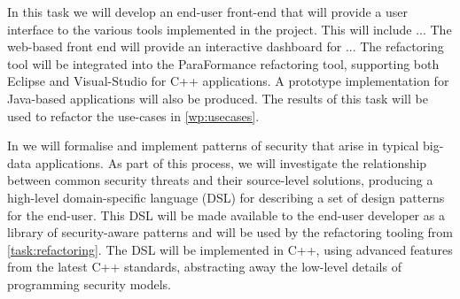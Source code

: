 \begin{Workpackage}{\thewpno}
\begin{Task}
\TaskResults{%
}
\TaskHeader{}

In this task we will develop an end-user front-end that will provide a user interface to the various tools implemented in the project. This will include ... 
The web-based front end will provide an interactive dashboard for ...
The refactoring tool will be integrated into the ParaFormance refactoring tool, supporting both Eclipse and Visual-Studio for C++ applications. A prototype implementation for Java-based applications will also be produced. The results of this task will be used to refactor the use-cases in \ref{wp:usecases}.



%
%
\end{Task}

\begin{Task}
	
	\TaskResults{%
	}
	\TaskHeader{}
	
In \theTask{} we will formalise and implement patterns of security that arise in typical big-data applications. As part of this process, we will investigate the relationship between common security threats and their source-level solutions, producing a high-level domain-specific language (DSL) for describing a set of design patterns for the end-user. This DSL will be made available to the end-user developer as a library of security-aware patterns and will be used by the refactoring tooling from \ref{task:refactoring}. The DSL will be implemented in C++, using advanced features from the latest C++ standards, abstracting away the low-level details of programming security models.


\end{Task}
\end{Workpackage}
